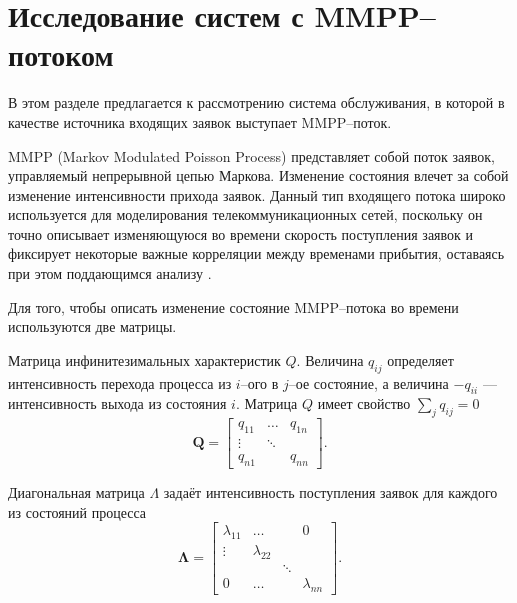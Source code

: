 \section {Исследование систем с MMPP--потоком} \label{mmpp_section}
В этом разделе предлагается к рассмотрению система обслуживания, в которой в качестве источника входящих заявок выступает MMPP--поток.

MMPP (Markov Modulated Poisson Process) представляет собой поток заявок, управляемый непрерывной цепью Маркова. Изменение состояния влечет за собой изменение интенсивности прихода заявок. Данный тип входящего потока широко используется для моделирования телекоммуникационных сетей, поскольку он точно описывает изменяющуюся во времени скорость поступления заявок и фиксирует некоторые важные корреляции между временами прибытия, оставаясь при этом поддающимся анализу \cite{fischer1993markov}.
 
Для того, чтобы описать изменение состояние MMPP--потока во времени используются две матрицы.

Матрица инфинитезимальных характеристик $Q$. Величина $q_{ij}$ определяет интенсивность перехода процесса из $i$--ого в $j$--ое состояние, а величина $-q_{ii}$ --- интенсивность выхода из состояния $i$.
Матрица $Q$ имеет свойство $\sum_{j}q_{ij} = 0$
\begin{equation*}
	\boldsymbol{Q}=\begin{bmatrix}
		q_{11} &  \dots &  q_{1n}\\
		\vdots & \ddots &  \\
		q_{n1} &    	&	q_{nn}
	\end{bmatrix}.
\end{equation*}

Диагональная матрица $\Lambda$ задаёт интенсивность поступления заявок для каждого из состояний процесса
\begin{equation*}
	\boldsymbol{\Lambda}=\begin{bmatrix}
		\lambda_{11}&	\dots	&   	 & 0\\
		\vdots 		&\lambda_{22}&  	 &   \\
		       		&    		& \ddots &   \\
		0  			&   \dots 	&		 & \lambda_{nn}
	\end{bmatrix}.
\end{equation*}

